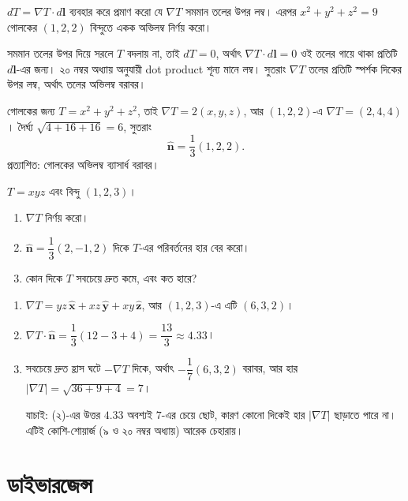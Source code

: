 \documentclass[11pt]{article}
\begin{document}
 $dT = \nabla T\cdot d\mathbf{l}$ ব্যবহার করে প্রমাণ করো যে
$\nabla T$ সমমান তলের উপর লম্ব। এরপর $x^{2}+y^{2}+z^{2} = 9$ গোলকের
$(1,2,2)$ বিন্দুতে একক অভিলম্ব নির্ণয় করো।

\begin{sol}
সমমান তলের উপর দিয়ে সরলে $T$ বদলায় না, তাই $dT = 0$, অর্থাৎ
$\nabla T\cdot d\mathbf{l} = 0$ ওই তলের গায়ে থাকা প্রতিটি $d\mathbf{l}$-এর
জন্য। ২০ নম্বর অধ্যায় অনুযায়ী dot product শূন্য মানে লম্ব। সুতরাং
$\nabla T$ তলের প্রতিটি স্পর্শক দিকের উপর লম্ব, অর্থাৎ তলের অভিলম্ব বরাবর।

গোলকের জন্য $T = x^{2}+y^{2}+z^{2}$, তাই
$\nabla T = 2\left( x, y, z \right)$, আর $(1,2,2)$-এ $\nabla T = (2,4,4)$।
দৈর্ঘ্য $\sqrt{4+16+16} = 6$, সুতরাং
\[
  \hat{\mathbf{n}} = \frac{1}{3}\left( 1, 2, 2 \right) .
\]
প্রত্যাশিত: গোলকের অভিলম্ব ব্যাসার্ধ বরাবর।
\end{sol}

 $T = xyz$ এবং বিন্দু $(1,2,3)$।
\begin{enumerate}
  \item $\nabla T$ নির্ণয় করো।
  \item $\hat{\mathbf{n}} = \dfrac{1}{3}(2,-1,2)$ দিকে $T$-এর পরিবর্তনের হার
        বের করো।
  \item কোন দিকে $T$ সবচেয়ে দ্রুত কমে, এবং কত হারে?
\end{enumerate}

\begin{sol}
\begin{enumerate}
  \item $\nabla T = yz\,\hat{\mathbf{x}} + xz\,\hat{\mathbf{y}}
        + xy\,\hat{\mathbf{z}}$, আর $(1,2,3)$-এ এটি $(6, 3, 2)$।
  \item $\nabla T\cdot\hat{\mathbf{n}} = \dfrac{1}{3}\left( 12 - 3 + 4 \right)
        = \dfrac{13}{3} \approx 4.33$।
  \item সবচেয়ে দ্রুত হ্রাস ঘটে $-\nabla T$ দিকে, অর্থাৎ
        $-\dfrac{1}{7}(6,3,2)$ বরাবর, আর হার $|\nabla T| = \sqrt{36+9+4} = 7$।

        যাচাই: (২)-এর উত্তর $4.33$ অবশ্যই $7$-এর চেয়ে ছোট, কারণ কোনো দিকেই
        হার $|\nabla T|$ ছাড়াতে পারে না। এটিই কোশি-শোয়ার্জ (৯ ও ২০ নম্বর
        অধ্যায়) আরেক চেহারায়।
\end{enumerate}
\end{sol}

\section{ডাইভারজেন্স}
\end{document}
